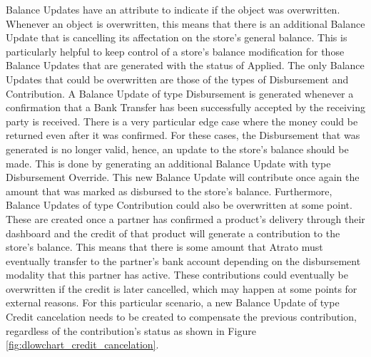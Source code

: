 Balance Updates have an attribute to indicate if the object was overwritten. Whenever an object is overwritten, this means that there is an additional Balance Update that is cancelling its affectation on the store’s general balance. This is particularly helpful to keep control of a store’s balance modification for those Balance Updates that are generated with the status of Applied. The only Balance Updates that could be overwritten are those of the types of Disbursement and Contribution. 
A Balance Update of type Disbursement is generated whenever a confirmation that a Bank Transfer has been successfully accepted by the receiving party is received. There is a very particular edge case where the money could be returned even after it was confirmed. For these cases, the Disbursement that was generated is no longer valid, hence, an update to the store’s balance should be made. This is done by generating an additional Balance Update with type Disbursement Override. This new Balance Update will contribute once again the amount that was marked as disbursed to the store’s balance.
Furthermore, Balance Updates of type Contribution could also be overwritten at some point. These are created once a partner has confirmed a product’s delivery through their dashboard and the credit of that product will generate a contribution to the store’s balance. This means that there is some amount that Atrato must eventually transfer to the partner’s bank account depending on the disbursement modality that this partner has active. These contributions could eventually be overwritten if the credit is later cancelled, which may happen at some points for external reasons. For this particular scenario, a new Balance Update of type Credit cancelation needs to be created to compensate the previous contribution, regardless of the contribution’s status as shown in Figure \ref{fig:dlowchart_credit_cancelation}.

